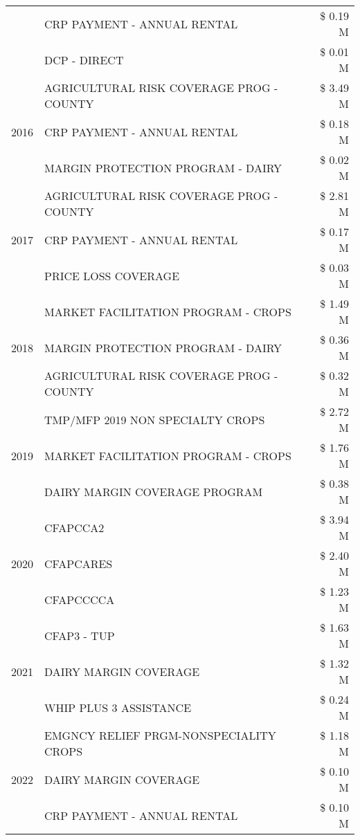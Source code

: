 \begin{tabular}{llr}
 & CRP PAYMENT - ANNUAL RENTAL & \$ 0.19 M \\
 & DCP - DIRECT & \$ 0.01 M \\
\cline{1-3}
\multirow[t]{3}{*}{2016} & AGRICULTURAL RISK COVERAGE PROG - COUNTY & \$ 3.49 M \\
 & CRP PAYMENT - ANNUAL RENTAL & \$ 0.18 M \\
 & MARGIN PROTECTION PROGRAM - DAIRY & \$ 0.02 M \\
\cline{1-3}
\multirow[t]{3}{*}{2017} & AGRICULTURAL RISK COVERAGE PROG - COUNTY & \$ 2.81 M \\
 & CRP PAYMENT - ANNUAL RENTAL & \$ 0.17 M \\
 & PRICE LOSS COVERAGE & \$ 0.03 M \\
\cline{1-3}
\multirow[t]{3}{*}{2018} & MARKET FACILITATION PROGRAM - CROPS & \$ 1.49 M \\
 & MARGIN PROTECTION PROGRAM - DAIRY & \$ 0.36 M \\
 & AGRICULTURAL RISK COVERAGE PROG - COUNTY & \$ 0.32 M \\
\cline{1-3}
\multirow[t]{3}{*}{2019} & TMP/MFP 2019 NON SPECIALTY CROPS & \$ 2.72 M \\
 & MARKET FACILITATION PROGRAM - CROPS & \$ 1.76 M \\
 & DAIRY MARGIN COVERAGE PROGRAM & \$ 0.38 M \\
\cline{1-3}
\multirow[t]{3}{*}{2020} & CFAPCCA2 & \$ 3.94 M \\
 & CFAPCARES & \$ 2.40 M \\
 & CFAPCCCCA & \$ 1.23 M \\
\cline{1-3}
\multirow[t]{3}{*}{2021} & CFAP3 - TUP & \$ 1.63 M \\
 & DAIRY MARGIN COVERAGE & \$ 1.32 M \\
 & WHIP PLUS 3 ASSISTANCE & \$ 0.24 M \\
\cline{1-3}
\multirow[t]{3}{*}{2022} & EMGNCY RELIEF PRGM-NONSPECIALITY CROPS & \$ 1.18 M \\
 & DAIRY MARGIN COVERAGE & \$ 0.10 M \\
 & CRP PAYMENT - ANNUAL RENTAL & \$ 0.10 M \\
\cline{1-3}
\bottomrule
\end{tabular}
